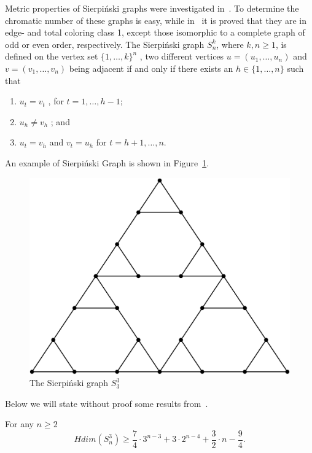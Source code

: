 \documentclass[12pt,a4paper,titlepage,openany]{report}
\begin{document}
Metric properties of Sierpi\'nski graphs were investigated in~\cite{Andreas}. To
determine the chromatic number of these graphs is easy, while in~\cite{Andreas2} it is proved that they are in
edge- and total coloring class 1, except those isomorphic to a complete graph of odd or even order, respectively.\newline
The Sierpi\'nski graph $S^k_n$, where $k,n\geq 1$, is defined on the vertex set $\{ 1,\ldots,k \}^n$ , two different vertices $u = (u_1 ,\ldots, u_n )$ and $v = (v_1 ,\ldots , v_n)$ being adjacent if and only if there exists an $h \in \{ 1 , \ldots, n \}$ such that
\begin{enumerate}[label=(\roman*)]
\item $u_t = v_t$ , for $t = 1 ,\ldots , h-1$;
\item $u_h \neq v_h$ ; and
\item $u_t = v_h$ and $v_t = u_h$ for $t = h+1 ,\ldots, n$.
\end{enumerate}
An example of Sierpi\'nski Graph is shown in Figure~\ref{fig:spierpinski}.
\begin{figure}[h]
\begin{center}
\includegraphics[width=1\linewidth]{figures/sierpinski.png}
\end{center}
\caption{The Sierpi\'nski graph $S^3_3$}\label{fig:spierpinski}
\end{figure}
Below we will state without proof some results from~\cite{Sandi}.

\begin{theorem}
For any $n\geq 2$
$$Hdim( S^3_n)\geq \frac{7}{4}\cdot 3^{n-3}+3\cdot 2^{n-4}+\frac{3}{2}\cdot n-\frac{9}{4}.$$
\end{theorem}
\end{document}
